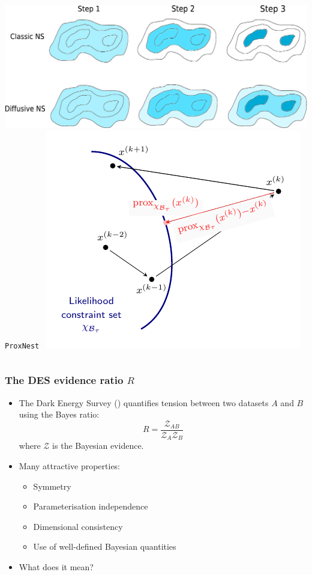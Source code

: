 \documentclass[aspectratio=169, handout]{beamer}
\begin{document}
\begin{frame}
\begin{columns}[t]
        \includegraphics[width=\textwidth]{figures/dnest}
        \texttt{ProxNest}~
        \includegraphics[width=\textwidth]{figures/proxnest_diagram}
        \vfill
    \end{columns}
\end{frame}

\begin{frame}
    \frametitle{The DES evidence ratio $R$}
    \begin{itemize}
        \item The Dark Energy Survey () quantifies tension between two datasets $A$ and $B$ using the Bayes ratio:
            \[
                R = \frac{\mathcal{Z}_{AB}}{\mathcal{Z}_A \mathcal{Z}_B}
            \]
            where $\mathcal{Z}$ is the Bayesian evidence.
        \item Many attractive properties:
            \begin{itemize}
                \item Symmetry
                \item Parameterisation independence
                \item Dimensional consistency
                \item Use of well-defined Bayesian quantities
            \end{itemize}
        \item What does it mean?
    \end{itemize}
\end{frame}
\end{document}
